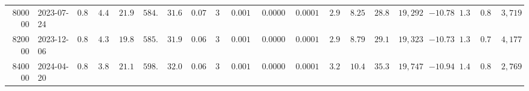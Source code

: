 \begin{tabular}{rlllllllllllllllllll}
800000 & 2023-07-24 & $0.87$ & $4.46$ & $21.92$ & $584.6$ & $31.69$ & $0.070$ & $33$ & $0.00171$ & $0.000052$ & $0.000118$ & $2.91$ & $8.25$ & $28.84$ & $19,292$ & $-10.78$ & $1.35$ & $0.81$ & $3,719$ \\
820000 & 2023-12-06 & $0.89$ & $4.39$ & $19.81$ & $585.5$ & $31.97$ & $0.065$ & $33$ & $0.00171$ & $0.000052$ & $0.000111$ & $2.91$ & $8.79$ & $29.19$ & $19,323$ & $-10.73$ & $1.31$ & $0.78$ & $4,177$ \\
840000 & 2024-04-20 & $0.88$ & $3.86$ & $21.14$ & $598.4$ & $32.07$ & $0.065$ & $33$ & $0.00167$ & $0.000051$ & $0.000135$ & $3.28$ & $10.46$ & $35.38$ & $19,747$ & $-10.94$ & $1.45$ & $0.86$ & $2,769$ \\
\bottomrule
\end{tabular}
